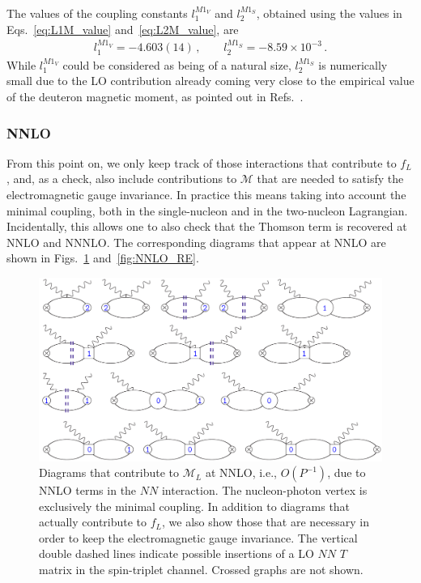 \documentclass[prl,
twocolumn,
showpacs,preprintnumbers,amsmath,amssymb,
superscriptaddress,
a4paper,nofootinbib,longbibliography]{revtex4-2}
\begin{document}
The values of the coupling constants $l_1^{M1_V}$ and $l_2^{M1_S}$, obtained using the values in Eqs.~\eqref{eq:L1M_value} and~\eqref{eq:L2M_value}, are
\begin{align}
l_1^{M1_V} = -4.603(14) \,,\qquad l_2^{M1_S} = -8.59\times 10^{-3}\,.
\label{eq:l1M_l2M_value}
\end{align}
While $l_1^{M1_V}$ could be considered as being of a natural size, $l_2^{M1_S}$ is numerically small due to the LO contribution already coming very close to the empirical value of the deuteron magnetic moment, as pointed out in Refs.~\cite{Kaplan:1998sz,Chen:1999tn}.
\subsubsection{NNLO}
From this point on, we only keep track of those interactions that contribute to $f_L$, and, as a check, also include contributions to $\mathcal{M}$ that are needed to satisfy the electromagnetic gauge invariance. In practice this means taking into account the minimal coupling, both in the single-nucleon and in the two-nucleon Lagrangian. Incidentally, this allows one to also check that the Thomson term is recovered at NNLO and NNNLO.
The corresponding diagrams that appear at NNLO are shown in Figs.~\ref{fig:NNLO} and~\ref{fig:NNLO_RE}.
\begin{figure}[htb]
    \centering
    \includegraphics[width=\textwidth]{figs/VVCS_NNLO.pdf}
    \caption{Diagrams that contribute to $\mathcal{M}_L$ at NNLO, i.e., $O(P^{-1})$, due to NNLO terms in the $NN$ interaction. The nucleon-photon vertex is exclusively the minimal coupling. In addition to diagrams that actually contribute to $f_L$, we also show those that are necessary in order to keep the electromagnetic gauge invariance. The vertical double dashed lines indicate possible insertions of a LO $NN$ $T$ matrix in the spin-triplet channel. Crossed graphs are not shown.}
    \label{fig:NNLO}
\end{figure}
\end{document}
